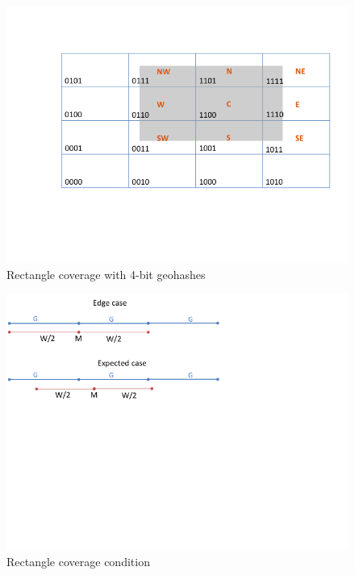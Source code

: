 \documentclass[times, utf8, diplomski]{fer}
\begin{document}
\begin{figure}[h]
\includegraphics[width=\textwidth, trim=105 150 25 85, clip]{geohash_grid/Slide1}
\caption{Rectangle coverage with 4-bit geohashes}
\label{geohash_grid}
\end{figure}

\begin{figure}[h]
\includegraphics[width=\textwidth, trim=0 320 250 0, clip]{geohash_grid/Slide2}
\caption{Rectangle coverage condition}
\label{geohash_condition}
\end{figure}
\end{document}
